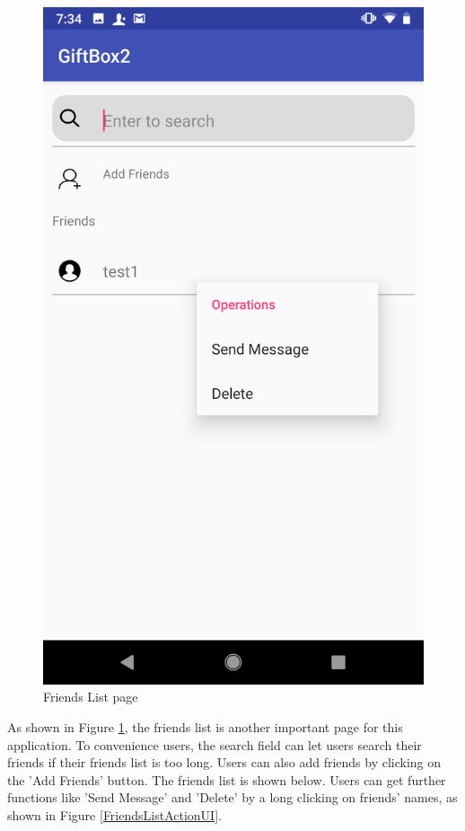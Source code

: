 \begin{figure}[htb]
\begin{minipage}[t]{0.5\textwidth}
\includegraphics[width=.95\textwidth]{section03/assets/FriendsListAction.png}
\subcaption{\label{FriendsListActionUI}}
\end{minipage}%
\caption[Short Caption 2]{\label{WholeFriendsListUI}Friends List page}
\end{figure}

\par As shown in Figure \ref{WholeFriendsListUI}, the friends list is another important page for this application. To convenience users, the search field can let users search their friends if their friends list is too long. Users can also add friends by clicking on the 'Add Friends' button. The friends list is shown below. Users can get further functions like 'Send Message' and 'Delete' by a long clicking on friends' names, as shown in Figure \ref{FriendsListActionUI}. 

